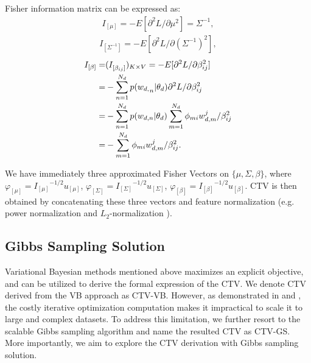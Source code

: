 \documentclass[journal]{IEEEtran}
\begin{document}
Fisher information matrix can be expressed as:
\begin{equation}
\begin{aligned}
    {I_{[\mu ]}} =  - E[{{{\partial ^2} L}}/{{\partial \mu ^2 }}] = {\Sigma ^{ - 1}},
    \end{aligned}
\end{equation}
\begin{equation}
\begin{aligned}
 {I_{[\Sigma^{-1} ]}} = - E[{{{\partial ^2} L}}/{{\partial ({\Sigma^{-1}}) ^2 }}],
 \end{aligned}
\end{equation}
\begin{equation}
  \begin{array}{l}
  \begin{aligned}
    {I_{[\beta ]}} = & {(I_{[{\beta _{ij}}]}^{})_{K \times V}} =  - E[{{{\partial ^2}L}}/{{\partial \beta _{ij}^2}}] \\
    \;\;\;\;\;\; = & - \sum\limits_{n = 1}^{{N_d}} {p({w_{d,}}_n|\theta_d )} {{{\partial ^2}L}}/{{\partial \beta _{ij}^2}}\\
    \;\;\;\;\;\; = & - \sum\limits_{n = 1}^{{N_d}} {p({w_{d,n}}|{\theta _d})} \sum\limits_{m = 1}^{{N_d}} {{{{\phi _{mi}}w_{d,m}^j}}/{{\beta _{ij}^2}}} \\
    \;\;\;\;\;\;{\rm{ = }} & - \sum\limits_{m = 1}^{{N_d}} {{{{\phi _{mi}}w_{d,m}^j}}/{{\beta _{ij}^2}}} .
    \end{aligned}
  \end{array}
\end{equation}

We have immediately three approximated Fisher Vectors on $\{ \mu ,\Sigma ,\beta \}$, where ${\varphi _{[\mu ]}} = {I_{[\mu ]}}^{ - 1/2}{u_{[\mu ]}}$, ${\varphi _{[\Sigma ]}} = {I_{[\Sigma ]}}^{ - 1/2}{u_{[\Sigma ]}}$, ${\varphi _{[\beta ]}} = {I_{[\beta ]}}^{ - 1/2}{u_{[\beta ]}}$. CTV is then obtained by concatenating these three vectors and feature normalization (e.g. power normalization and $L_2$-normalization \cite{perronnin2010improving}\cite{sanchez2013image}).

\subsection{Gibbs Sampling Solution}
Variational Bayesian methods mentioned above maximizes an explicit objective, and can be utilized to derive the formal expression of the CTV. We denote CTV derived from the VB approach as CTV-VB. However, as demonstrated in \cite{chen2013scalable} and \cite{mimno2008gibbs}, the costly iterative optimization computation makes it impractical to scale it to large and complex datasets. To address this limitation, we further resort to the scalable Gibbs sampling algorithm \cite{chen2013scalable} and name the resulted CTV as CTV-GS. More importantly, we aim to explore the CTV derivation with Gibbs sampling solution.
\end{document}
